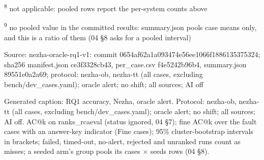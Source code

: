 \textsuperscript{8} not applicable: pooled rows report the per-system counts above\par
\textsuperscript{9} no pooled value in the committed results: summary.json pools case means only, and this is a ratio of them (04 \S{}8 asks for a pooled interval)\par
\noindent Source: nezha-oracle-rq1-v1: commit 0654af62a1a093474e56ee1066f1886135375324; sha256 manifest.json ce3f3328cb43, per\_case.csv f4e5242b96b4, summary.json 89551e0a2a69; protocol: nezha-ob, nezha-tt (all cases, excluding bench/\allowbreak{}dev\_cases.yaml); oracle alert; no shift; all sources; AI off\par
\noindent Generated caption: RQ1 accuracy, Nezha, oracle alert. Protocol: nezha-ob, nezha-tt (all cases, excluding bench/\allowbreak{}dev\_cases.yaml); oracle alert; no shift; all sources; AI off. AC@k on ranks\_rcaeval (status ignored, 04 \S{}7); fine AC@k over the fault cases with an answer-key indicator (Fine cases); 95\% cluster-bootstrap intervals in brackets; failed, timed-out, no-alert, rejected and unranked runs count as misses; a seeded arm's group pools its cases $\times$ seeds rows (04 \S{}8).\par
\endgroup
